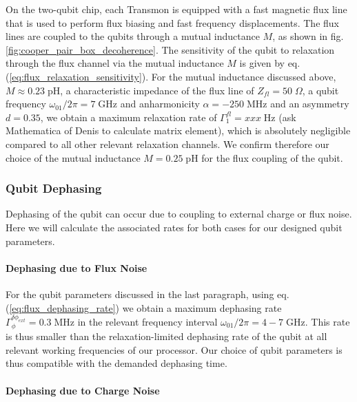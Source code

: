 On the two-qubit chip, each Transmon is equipped with a fast magnetic flux line that is used to perform flux biasing and fast frequency displacements. The flux lines are coupled to the qubits through a mutual inductance $M$, as shown in fig. \ref{fig:cooper_pair_box_decoherence}. The sensitivity of the qubit to relaxation through the flux channel via the mutual inductance $M$ is given by eq. (\ref{eq:flux_relaxation_sensitivity}). For the mutual inductance discussed above, $M \approx 0.23\;\mathrm{pH}$, a characteristic impedance of the flux line of $Z_{fl}=50\;\Omega$, a qubit frequency $\omega_{01}/2\pi= 7 \;\mathrm{GHz}$ and anharmonicity $\alpha=-250\;\mathrm{MHz}$ and an asymmetry $d=0.35$, we obtain a maximum relaxation rate of $\Gamma_1^{fl}=xxx\;\mathrm{Hz}$ (ask Mathematica of Denis to calculate matrix element), which is absolutely negligible compared to all other relevant relaxation channels. We confirm therefore our choice of the mutual inductance $M=0.25\;\mathrm{pH}$ for the flux coupling of the qubit. 

\subsubsection{Qubit Dephasing}

Dephasing of the qubit can occur due to coupling to external charge or flux noise. Here we will calculate the associated rates for both cases for our designed qubit parameters.

\paragraph{Dephasing due to Flux Noise}

For the qubit parameters discussed in the last paragraph, using eq. (\ref{eq:flux_dephasing_rate}) we obtain a maximum dephasing rate $\Gamma_\phi^{\delta \phi_{ext}}= 0.3\;\mathrm{MHz}$ in the relevant frequency interval $\omega_{01}/2\pi = 4-7 \; \mathrm{GHz}$. This rate is thus smaller than the relaxation-limited dephasing rate of the qubit at all relevant working frequencies of our processor. Our choice of qubit parameters is thus compatible with the demanded dephasing time.

\paragraph{Dephasing due to Charge Noise}

